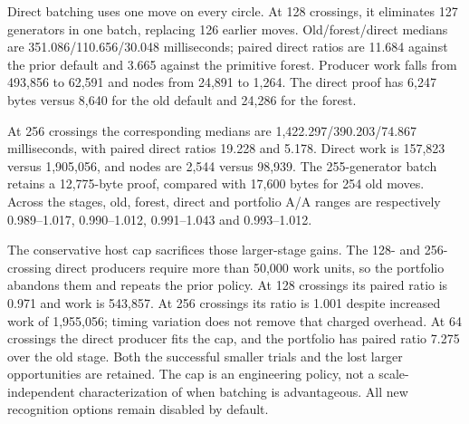 Direct batching uses one move on every circle. At 128 crossings, it
eliminates 127 generators in one batch, replacing 126 earlier moves.
Old/forest/direct medians are 351.086/110.656/30.048 milliseconds;
paired direct ratios are 11.684 against the prior default and 3.665
against the primitive forest. Producer work falls from 493,856 to 62,591
and nodes from 24,891 to 1,264. The direct proof has 6,247 bytes versus
8,640 for the old default and 24,286 for the forest.

At 256 crossings the corresponding medians are
1,422.297/390.203/74.867 milliseconds, with paired direct ratios
19.228 and 5.178. Direct work is 157,823 versus 1,905,056, and nodes
are 2,544 versus 98,939. The 255-generator batch retains a 12,775-byte
proof, compared with 17,600 bytes for 254 old moves. Across the stages,
old, forest, direct and portfolio A/A ranges are respectively
0.989--1.017, 0.990--1.012, 0.991--1.043 and 0.993--1.012.

The conservative host cap sacrifices those larger-stage gains. The
128- and 256-crossing direct producers require more than 50,000 work
units, so the portfolio abandons them and repeats the prior policy.
At 128 crossings its paired ratio is 0.971 and work is 543,857.
At 256 crossings its ratio is 1.001 despite increased work of 1,955,056;
timing variation does not remove that charged overhead. At 64 crossings
the direct producer fits the cap, and the portfolio has paired ratio
7.275 over the old stage. Both the successful smaller trials and the
lost larger opportunities are retained. The cap is an engineering policy,
not a scale-independent characterization of when batching is advantageous.
All new recognition options remain disabled by default.
